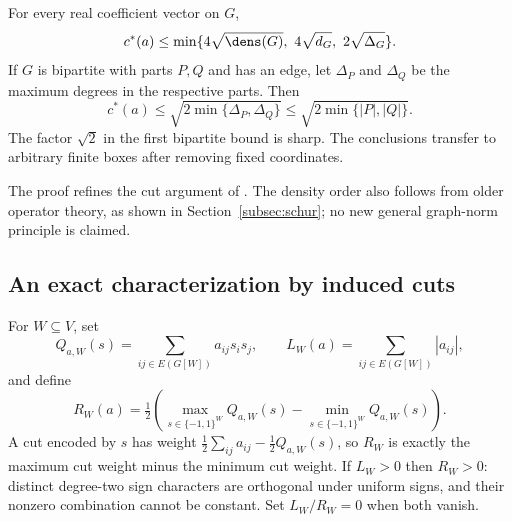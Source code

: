 \begin{theorem}\label{thm:bilinear-upper}
For every real coefficient vector on $G$,
\begin{equation}\label{eq:bilinear-upper}
 c^*(a)\le\min\{4\sqrt{\dens(G)},\ 4\sqrt{d_G},\ 2\sqrt{\Delta_G}\}.
\end{equation}
If $G$ is bipartite with parts $P,Q$ and has an edge, let $\Delta_P$ and
$\Delta_Q$ be the maximum degrees in the respective parts. Then
\begin{equation}\label{eq:bipartite-upper}
 c^*(a)\le\sqrt{2\min\{\Delta_P,\Delta_Q\}}
       \le\sqrt{2\min\{|P|,|Q|\}}.
\end{equation}
The factor $\sqrt2$ in the first bipartite bound is sharp. The conclusions
transfer to arbitrary finite boxes after removing fixed coordinates.
\end{theorem}
The proof refines the cut argument of \citet{Boland2017}. The density order
also follows from older operator theory, as shown in
Section~\ref{subsec:schur}; no new general graph-norm principle is claimed.

\subsection{An exact characterization by induced cuts}
For $W\subseteq V$, set
\[
 Q_{a,W}(s)=\sum_{ij\in E(G[W])}a_{ij}s_is_j,\qquad
 L_W(a)=\sum_{ij\in E(G[W])}|a_{ij}|,
\]
and define
\begin{equation}\label{eq:cut-range}
 R_W(a)=\tfrac12\left(\max_{s\in\{-1,1\}^W}Q_{a,W}(s)
                         -\min_{s\in\{-1,1\}^W}Q_{a,W}(s)\right).
\end{equation}
A cut encoded by $s$ has weight $\tfrac12\sum_{ij}a_{ij}-\tfrac12Q_{a,W}(s)$,
so $R_W$ is exactly the maximum cut weight minus the minimum cut weight.
If $L_W>0$ then $R_W>0$: distinct degree-two sign characters are orthogonal
under uniform signs, and their nonzero combination cannot be constant.
Set $L_W/R_W=0$ when both vanish.

